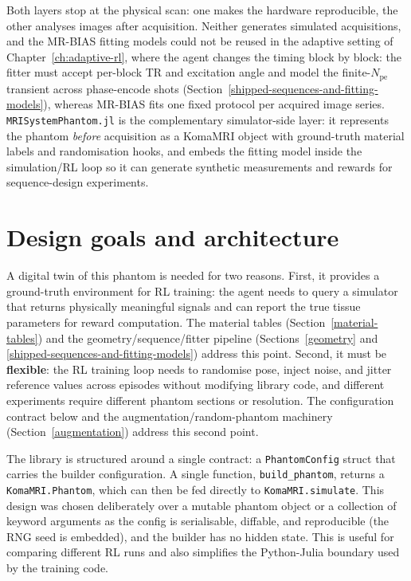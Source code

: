 Both layers stop at the physical scan: one makes the hardware reproducible,
the other analyses images after acquisition. Neither generates simulated
acquisitions, and the MR-BIAS fitting models could not be reused in the
adaptive setting of Chapter~\ref{ch:adaptive-rl}, where the agent changes
the timing block by block: the fitter must accept per-block TR and
excitation angle and model the finite-$N_\mathrm{pe}$ transient across
phase-encode shots
(Section~\ref{shipped-sequences-and-fitting-models}), whereas MR-BIAS fits
one fixed protocol per acquired image series.
\texttt{MRISystemPhantom.jl} is the complementary simulator-side layer: it
represents the phantom \emph{before} acquisition as a KomaMRI object with
ground-truth material labels and randomisation hooks, and embeds the fitting
model inside the simulation/RL loop so it can generate synthetic
measurements and rewards for sequence-design experiments.

\hypertarget{design-goals-and-architecture}{%
\section{Design goals and
architecture}\label{design-goals-and-architecture}}

A digital twin of this phantom is needed for two reasons. First, it
provides a ground-truth environment for RL training: the agent needs to
query a simulator that returns physically meaningful signals and can
report the true tissue parameters for reward computation. The material
tables (Section~\ref{material-tables}) and the geometry/sequence/fitter
pipeline (Sections~\ref{geometry} and
\ref{shipped-sequences-and-fitting-models}) address this point. Second, it
must be \textbf{flexible}: the RL training loop needs to randomise pose,
inject noise, and jitter reference values across episodes without
modifying library code, and different experiments require different phantom
sections or resolution. The configuration contract below and the
augmentation/random-phantom machinery (Section~\ref{augmentation}) address
this second point.

The library is structured around a single contract: a
\texttt{PhantomConfig} struct that carries the builder configuration.
A single function, \texttt{build\_phantom}, returns a
\texttt{KomaMRI.Phantom}, which can then be fed directly to
\texttt{KomaMRI.simulate}. This design was chosen deliberately over a
mutable phantom object or a collection of keyword arguments as the
config is serialisable, diffable, and reproducible (the RNG seed is
embedded), and the builder has no hidden state. This is useful for
comparing different RL runs and also simplifies the Python-Julia
boundary used by the training code.

